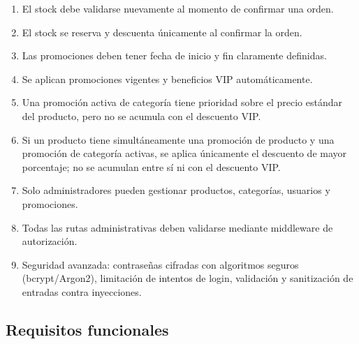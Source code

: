 \documentclass[12pt,a4paper]{article}
\begin{document}
\begin{enumerate}[label=RN\arabic*:]
    \item El stock debe validarse nuevamente al momento de confirmar una orden.
    \item El stock se reserva y descuenta únicamente al confirmar la orden.
    \item Las promociones deben tener fecha de inicio y fin claramente definidas.
    \item Se aplican promociones vigentes y beneficios VIP automáticamente.
    \item Una promoción activa de categoría tiene prioridad sobre el precio estándar del producto, pero no se acumula con el descuento VIP.
    \item Si un producto tiene simultáneamente una promoción de producto y una promoción de categoría activas, se aplica únicamente el descuento de mayor porcentaje; no se acumulan entre sí ni con el descuento VIP.
    \item Solo administradores pueden gestionar productos, categorías, usuarios y promociones.
    \item Todas las rutas administrativas deben validarse mediante middleware de autorización.
    \item Seguridad avanzada: contraseñas cifradas con algoritmos seguros (bcrypt/Argon2), limitación de intentos de login, validación y sanitización de entradas contra inyecciones.
\end{enumerate}



\subsection{Requisitos funcionales}
\end{document}
